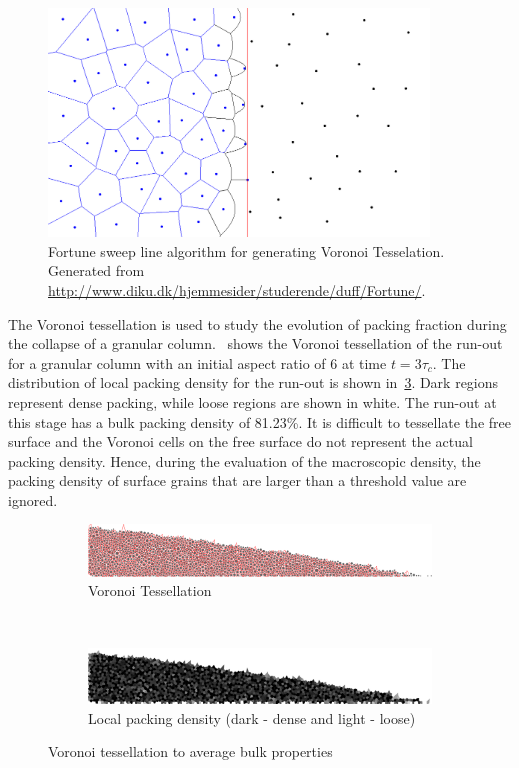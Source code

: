 \begin{figure}[tbhp]
\centering
\includegraphics[width=0.9\textwidth]{sweep_voro}
\caption{Fortune sweep line algorithm for generating Voronoi Tesselation. 
Generated from \url{http://www.diku.dk/hjemmesider/studerende/duff/Fortune/}.}
\label{fig:sweep_voro}
\end{figure}

The Voronoi tessellation is used to study the evolution of packing fraction 
during the collapse of a granular column.~ shows the 
Voronoi tessellation of the run-out for a granular column with an initial 
aspect ratio of 6 at time $t = 3 \tau_c$. The distribution of local packing 
density for the run-out is shown in~\cref{fig:local_density}. Dark regions 
represent dense packing, while loose regions are shown in white. The run-out at 
this stage has a bulk packing density of 81.23\%. It is difficult to tessellate 
the free surface and the Voronoi cells on the free surface do not represent the 
actual packing density. Hence, during the evaluation of the macroscopic 
density, the packing density of surface grains that are larger than a threshold 
value are ignored.

\begin{figure}[tbhp]
\centering
\begin{subfigure}[b]{0.95\textwidth}
\centering
\includegraphics[width=\textwidth]{tessellation}
\caption{Voronoi Tessellation}
\label{fig:tessellation}
\end{subfigure}
\\
\begin{subfigure}[b]{0.95\textwidth}
\centering
\includegraphics[width=\textwidth]{local_density}
\caption{Local packing density (dark - dense and light - loose)}
\label{fig:local_density}
\end{subfigure}
\caption{Voronoi tessellation to average bulk properties}
\label{fig:voro}
\end{figure}

